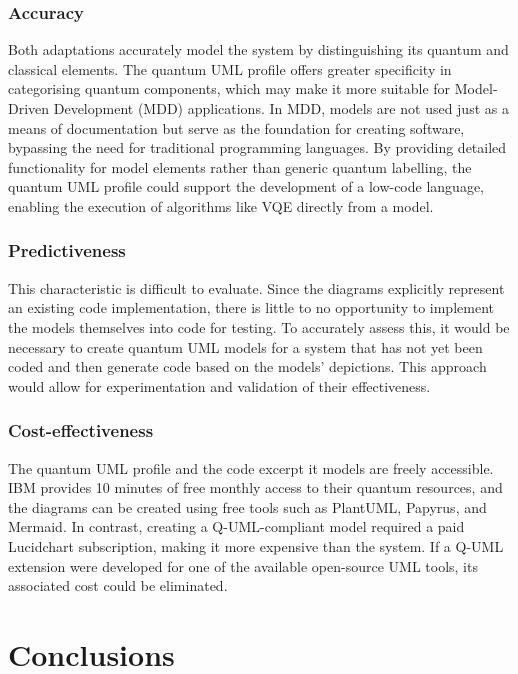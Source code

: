 \documentclass{article}
\begin{document}
\subsubsection{Accuracy}

Both adaptations accurately model the system by distinguishing its quantum and classical elements. The quantum UML profile offers greater specificity in categorising quantum components, which may make it more suitable for Model-Driven Development (MDD) applications. In MDD, models are not used just as a means of documentation but serve as the foundation for creating software, bypassing the need for traditional programming languages\cite{LUCIO2014103}. By providing detailed functionality for model elements rather than generic quantum labelling, the quantum UML profile could support the development of a low-code language, enabling the execution of algorithms like VQE directly from a model.

\subsubsection{Predictiveness}

This characteristic is difficult to evaluate. Since the diagrams explicitly represent an existing code implementation, there is little to no opportunity to implement the models themselves into code for testing. To accurately assess this, it would be necessary to create quantum UML models for a system that has not yet been coded and then generate code based on the models' depictions. This approach would allow for experimentation and validation of their effectiveness.

\subsubsection{Cost-effectiveness}

The quantum UML profile and the code excerpt it models are freely accessible. IBM provides 10 minutes of free monthly access to their quantum resources, and the diagrams can be created using free tools such as PlantUML, Papyrus, and Mermaid. In contrast, creating a Q-UML-compliant model required a paid Lucidchart subscription, making it more expensive than the system. If a Q-UML extension were developed for one of the available open-source UML tools, its associated cost could be eliminated.

\section{Conclusions}
\end{document}
